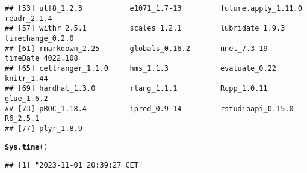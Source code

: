 \documentclass{article}\usepackage[]{graphicx}\usepackage[]{xcolor}
\makeatletter
\newcommand{\hlstd}[1]{\textcolor[rgb]{0.345,0.345,0.345}{#1}}%
\newcommand{\hlkwd}[1]{\textcolor[rgb]{0.737,0.353,0.396}{\textbf{#1}}}%
\newenvironment{kframe}{%
 \def\at@end@of@kframe{}%
 \ifinner\ifhmode%
  \def\at@end@of@kframe{\end{minipage}}%
  \begin{minipage}{\columnwidth}%
 \fi\fi%
 \def\FrameCommand##1{\hskip\@totalleftmargin \hskip-\fboxsep
 \colorbox{shadecolor}{##1}\hskip-\fboxsep
     \hskip-\linewidth \hskip-\@totalleftmargin \hskip\columnwidth}%
 \MakeFramed {\advance\hsize-\width
   \@totalleftmargin\z@ \linewidth\hsize
   \@setminipage}}%
 {\par\unskip\endMakeFramed%
 \at@end@of@kframe}
\newenvironment{knitrout}{}{} %
\makeatother
\begin{document}
\begin{knitrout}
\begin{kframe}
\begin{verbatim}
## [53] utf8_1.2.3           e1071_1.7-13         future.apply_1.11.0  readr_2.1.4         
## [57] withr_2.5.1          scales_1.2.1         lubridate_1.9.3      timechange_0.2.0    
## [61] rmarkdown_2.25       globals_0.16.2       nnet_7.3-19          timeDate_4022.108   
## [65] cellranger_1.1.0     hms_1.1.3            evaluate_0.22        knitr_1.44          
## [69] hardhat_1.3.0        rlang_1.1.1          Rcpp_1.0.11          glue_1.6.2          
## [73] pROC_1.18.4          ipred_0.9-14         rstudioapi_0.15.0    R6_2.5.1            
## [77] plyr_1.8.9
\end{verbatim}
\begin{alltt}
\hlkwd{Sys.time}\hlstd{()}
\end{alltt}
\begin{verbatim}
## [1] "2023-11-01 20:39:27 CET"
\end{verbatim}
\end{kframe}
\end{knitrout}
\end{document}

